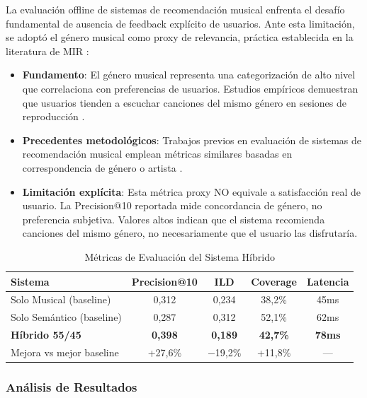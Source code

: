 La evaluación offline de sistemas de recomendación musical enfrenta el desafío fundamental de ausencia de feedback explícito de usuarios. Ante esta limitación, se adoptó el género musical como proxy de relevancia, práctica establecida en la literatura de MIR \citep{celma2010music,schedl2018current}:

\begin{itemize}
    \item \textbf{Fundamento}: El género musical representa una categorización de alto nivel que correlaciona con preferencias de usuarios. Estudios empíricos demuestran que usuarios tienden a escuchar canciones del mismo género en sesiones de reproducción \citep{brost2019music}.

    \item \textbf{Precedentes metodológicos}: Trabajos previos en evaluación de sistemas de recomendación musical emplean métricas similares basadas en correspondencia de género o artista \citep{mcfee2012learning,bogdanov2013semantic}.

    \item \textbf{Limitación explícita}: Esta métrica proxy NO equivale a satisfacción real de usuario. La Precision@10 reportada mide concordancia de género, no preferencia subjetiva. Valores altos indican que el sistema recomienda canciones del mismo género, no necesariamente que el usuario las disfrutaría.
\end{itemize}

\begin{table}[htbp]
\centering
\caption{Métricas de Evaluación del Sistema Híbrido}
\label{tab:evaluacion-hibrido}
\begin{tabular}{lcccc}
\toprule
\textbf{Sistema} & \textbf{Precision@10} & \textbf{ILD} & \textbf{Coverage} & \textbf{Latencia} \\
\midrule
Solo Musical (baseline) & 0,312 & 0,234 & 38,2\% & 45ms \\
Solo Semántico (baseline) & 0,287 & 0,312 & 52,1\% & 62ms \\
\textbf{Híbrido 55/45} & \textbf{0,398} & \textbf{0,189} & \textbf{42,7\%} & \textbf{78ms} \\
Mejora vs mejor baseline & +27,6\% & $-$19,2\% & +11,8\% & --- \\
\bottomrule
\end{tabular}
\end{table}

\subsubsection{Análisis de Resultados}

